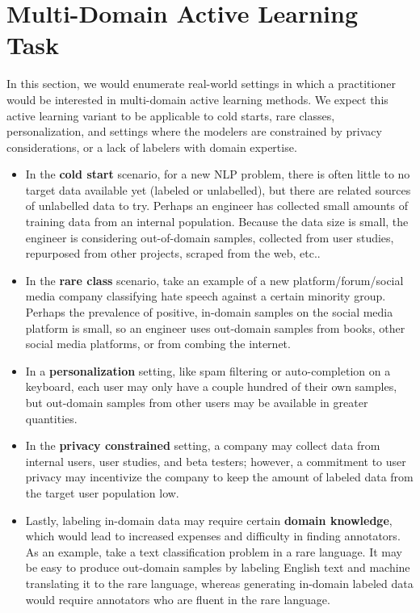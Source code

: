

\clearpage
\appendix

\section{Multi-Domain Active Learning Task}
\label{sec:appendix-task}

In this section, we would enumerate real-world settings in which a practitioner would be interested in multi-domain active learning methods.
We expect this active learning variant to be applicable to cold starts, rare classes, personalization, and settings where the modelers are constrained by privacy considerations, or a lack of labelers with domain expertise.

\respace
\begin{itemize}\itemsep0em
    \item In the \textbf{cold start} scenario, for a new NLP problem, there is often little to no target data available yet (labeled or unlabelled), but there are related sources of unlabelled data to try. 
    Perhaps an engineer has collected small amounts of training data from an internal population. Because the data size is small, the engineer is considering out-of-domain samples, collected from user studies, repurposed from other projects, scraped from the web, etc..
    \item In the \textbf{rare class} scenario, take an example of a new platform/forum/social media company classifying hate speech against a certain minority group. 
    Perhaps the prevalence of positive, in-domain samples on the social media platform is small, so an engineer uses out-domain samples from books, other social media platforms, or from combing the internet.
    \item In a \textbf{personalization} setting, like spam filtering or auto-completion on a keyboard, each user may only have a couple hundred of their own samples, but out-domain samples from other users may be available in greater quantities.
    \item In the \textbf{privacy constrained} setting, a company may collect data from internal users, user studies, and beta testers; however, a commitment to user privacy may incentivize the company to keep the amount of labeled data from the target user population low.
    \item Lastly, labeling in-domain data may require certain \textbf{domain knowledge}, which would lead to increased expenses and difficulty in finding annotators. 
    As an example, take a text classification problem in a rare language. 
    It may be easy to produce out-domain samples by labeling English text and machine translating it to the rare language, whereas generating in-domain labeled data would require annotators who are fluent in the rare language.
\end{itemize}
    
